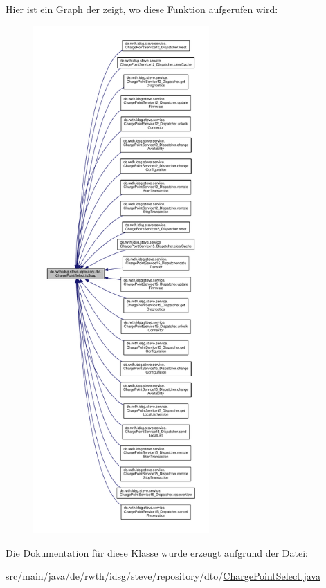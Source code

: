 Hier ist ein Graph der zeigt, wo diese Funktion aufgerufen wird\+:\nopagebreak
\begin{figure}[H]
\begin{center}
\leavevmode
\includegraphics[height=550pt]{classde_1_1rwth_1_1idsg_1_1steve_1_1repository_1_1dto_1_1_charge_point_select_abc2c6a1b288106f9a82dd089df66b6f7_icgraph}
\end{center}
\end{figure}




Die Dokumentation für diese Klasse wurde erzeugt aufgrund der Datei\+:\begin{DoxyCompactItemize}
\item 
src/main/java/de/rwth/idsg/steve/repository/dto/\hyperlink{_charge_point_select_8java}{Charge\+Point\+Select.\+java}\end{DoxyCompactItemize}

